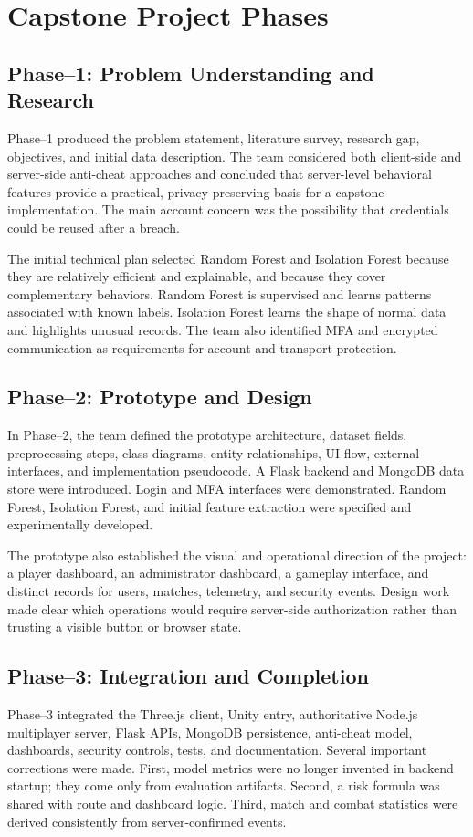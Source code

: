 \documentclass[12pt,a4paper,oneside]{report}
\begin{document}
\chapter{Capstone Project Phases}
\section{Phase--1: Problem Understanding and Research}
Phase--1 produced the problem statement, literature survey, research gap, objectives, and initial data description. The team considered both client-side and server-side anti-cheat approaches and concluded that server-level behavioral features provide a practical, privacy-preserving basis for a capstone implementation. The main account concern was the possibility that credentials could be reused after a breach.

The initial technical plan selected Random Forest and Isolation Forest because they are relatively efficient and explainable, and because they cover complementary behaviors. Random Forest is supervised and learns patterns associated with known labels. Isolation Forest learns the shape of normal data and highlights unusual records. The team also identified MFA and encrypted communication as requirements for account and transport protection.

\section{Phase--2: Prototype and Design}
In Phase--2, the team defined the prototype architecture, dataset fields, preprocessing steps, class diagrams, entity relationships, UI flow, external interfaces, and implementation pseudocode. A Flask backend and MongoDB data store were introduced. Login and MFA interfaces were demonstrated. Random Forest, Isolation Forest, and initial feature extraction were specified and experimentally developed.

The prototype also established the visual and operational direction of the project: a player dashboard, an administrator dashboard, a gameplay interface, and distinct records for users, matches, telemetry, and security events. Design work made clear which operations would require server-side authorization rather than trusting a visible button or browser state.

\section{Phase--3: Integration and Completion}
Phase--3 integrated the Three.js client, Unity entry, authoritative Node.js multiplayer server, Flask APIs, MongoDB persistence, anti-cheat model, dashboards, security controls, tests, and documentation. Several important corrections were made. First, model metrics were no longer invented in backend startup; they come only from evaluation artifacts. Second, a risk formula was shared with route and dashboard logic. Third, match and combat statistics were derived consistently from server-confirmed events.
\end{document}
